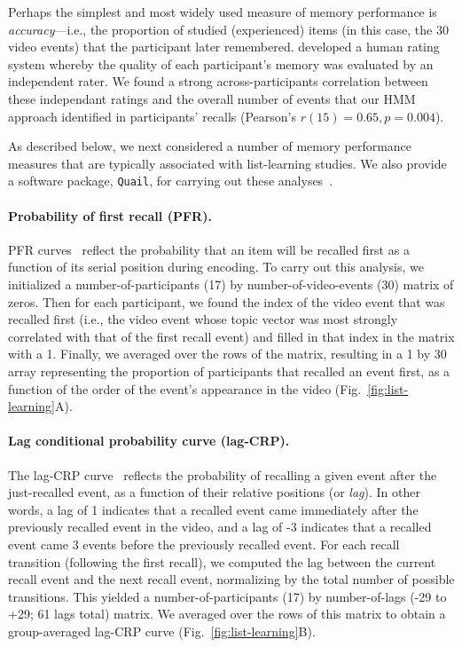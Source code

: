 \documentclass{article}
\begin{document}
Perhaps the simplest and most widely used measure of memory performance is \textit{accuracy}---i.e., the proportion of studied (experienced) items (in this case, the 30 video events) that the participant later remembered.  \cite{ChenEtal17} developed a human rating system whereby the quality of each participant's memory was evaluated by an independent rater.  We found a strong across-participants correlation between these independant ratings and the overall number of events that our HMM approach identified in participants' recalls (Pearson's $r(15) = 0.65, p = 0.004$).

As described below, we next considered a number of memory performance measures that are typically associated with list-learning studies.  We also provide a software package, \texttt{Quail}, for carrying out these analyses~\citep{HeusEtal17b}.

\paragraph{Probability of first recall (PFR).}  PFR curves~\citep{WelcBurn24, PostPhil65, AtkiShif68} reflect the probability that an item will be recalled first as a function of its serial position during encoding. To carry out this analysis, we initialized a number-of-participants (17) by number-of-video-events (30) matrix of zeros. Then for each participant, we found the index of the video event that was recalled first (i.e., the video event whose topic vector was most strongly correlated with that of the first recall event) and filled in that index in the matrix with a 1.  Finally, we averaged over the rows of the matrix, resulting in a 1 by 30 array representing the proportion of participants that recalled an event first, as a function of the order of the event's appearance in the video (Fig.~\ref{fig:list-learning}A).

\paragraph{Lag conditional probability curve (lag-CRP).} The lag-CRP curve~\citep{Kaha96} reflects the probability of recalling a given event after the just-recalled event, as a function of their relative positions (or \textit{lag}).  In other words, a lag of 1 indicates that a recalled event came immediately after the previously recalled event in the video, and a lag of -3 indicates that a recalled event came 3 events before the previously recalled event.  For each recall transition (following the first recall), we computed the lag between the current recall event and the next recall event, normalizing by the total number of possible transitions.  This yielded a number-of-participants (17) by number-of-lags (-29 to +29; 61 lags total) matrix. We averaged over the rows of this matrix to obtain a group-averaged lag-CRP curve (Fig.~\ref{fig:list-learning}B).
\end{document}
